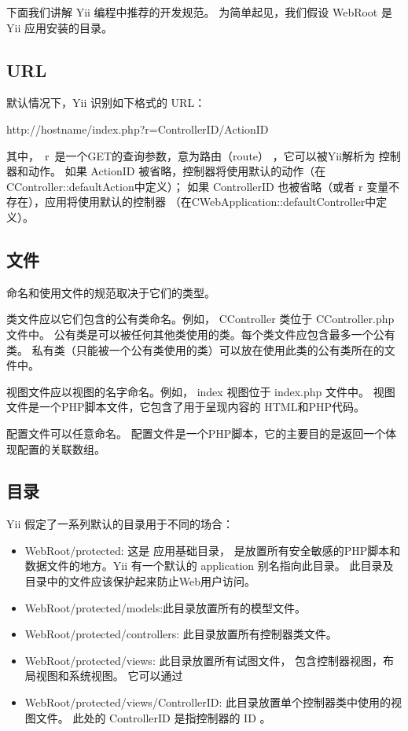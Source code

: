 下面我们讲解 Yii 编程中推荐的开发规范。 为简单起见，我们假设 WebRoot 是 Yii 应用安装的目录。

\subsection{URL}
默认情况下，Yii 识别如下格式的 URL：

http://hostname/index.php?r=ControllerID/ActionID

其中，~r~是一个GET的查询参数，意为路由（route） ，它可以被Yii解析为 控制器和动作。 如果 ActionID 被省略，控制器将使用默认的动作（在CController::defaultAction中定义）； 如果 ControllerID 也被省略（或者 r 变量不存在），应用将使用默认的控制器 （在CWebApplication::defaultController中定义）。

\subsection{文件}

命名和使用文件的规范取决于它们的类型。

类文件应以它们包含的公有类命名。例如， CController 类位于 CController.php 文件中。 公有类是可以被任何其他类使用的类。每个类文件应包含最多一个公有类。 私有类（只能被一个公有类使用的类）可以放在使用此类的公有类所在的文件中。

视图文件应以视图的名字命名。例如， index 视图位于 index.php 文件中。 视图文件是一个PHP脚本文件，它包含了用于呈现内容的 HTML和PHP代码。

配置文件可以任意命名。 配置文件是一个PHP脚本，它的主要目的是返回一个体现配置的关联数组。

\subsection{目录}
\label{yiiprotocoldir}

Yii 假定了一系列默认的目录用于不同的场合：
\begin{itemize}
\item WebRoot/protected: 这是 应用基础目录， 是放置所有安全敏感的PHP脚本和数据文件的地方。Yii 有一个默认的 application 别名指向此目录。 此目录及目录中的文件应该保护起来防止Web用户访问。
\item WebRoot/protected/models:此目录放置所有的模型文件。
\item WebRoot/protected/controllers: 此目录放置所有控制器类文件。
\item WebRoot/protected/views: 此目录放置所有试图文件， 包含控制器视图，布局视图和系统视图。 它可以通过
\item WebRoot/protected/views/ControllerID: 此目录放置单个控制器类中使用的视图文件。 此处的 ControllerID 是指控制器的 ID 。
\end{itemize}

